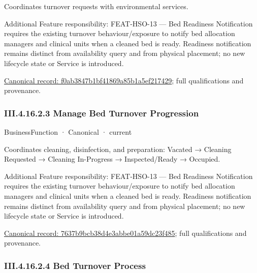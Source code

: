 Coordinates turnover requests with environmental services.



Additional Feature responsibility: FEAT-HSO-13 — Bed Readiness Notification requires the existing turnover behaviour/exposure to notify bed allocation managers and clinical units when a cleaned bed is ready. Readiness notification remains distinct from availability query and from physical placement; no new lifecycle state or Service is introduced.


{\footnotesize \href{../../../../../../../../continuum/business/business-service/f0ab3847b1bf41869a85b1a5ef217429.md}{Canonical record: f0ab3847b1bf41869a85b1a5ef217429}; full qualifications and provenance.}\par
\subsubsection*{III.4.16.2.3 Manage Bed Turnover Progression}
\label{navigation:III.4.16.2.3}

\label{element:7637b9bcb38d4e3abbe01a59dc23f485}
{\small BusinessFunction · Canonical · current}\par

Coordinates cleaning, disinfection, and preparation: Vacated → Cleaning Requested → Cleaning In-Progress → Inspected/Ready → Occupied.



Additional Feature responsibility: FEAT-HSO-13 — Bed Readiness Notification requires the existing turnover behaviour/exposure to notify bed allocation managers and clinical units when a cleaned bed is ready. Readiness notification remains distinct from availability query and from physical placement; no new lifecycle state or Service is introduced.


{\footnotesize \href{../../../../../../../../continuum/business/business-function/7637b9bcb38d4e3abbe01a59dc23f485.md}{Canonical record: 7637b9bcb38d4e3abbe01a59dc23f485}; full qualifications and provenance.}\par
\subsubsection*{III.4.16.2.4 Bed Turnover Process}
\label{navigation:III.4.16.2.4}

